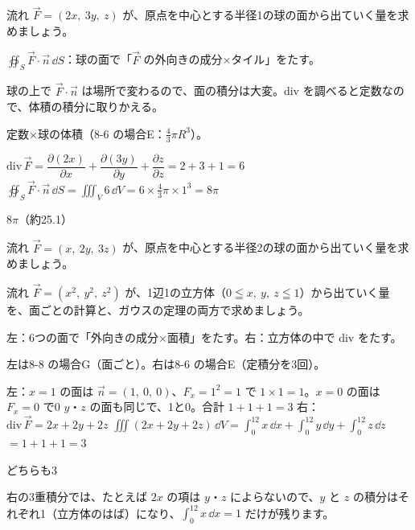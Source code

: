 \begin{reidai}
流れ $\vec F=(2x,\ 3y,\ z)$ が、原点を中心とする半径1の球の面から出ていく量を求めましょう。\par
\kangaekata {}\par
{}\enspace $\oiint_S\vec F\cdot\vec n\,\dd S$：球の面で「$\vec F$ の外向きの成分×タイル」をたす。\par
{}\enspace 球の上で $\vec F\cdot\vec n$ は場所で変わるので、面の積分は大変。div を調べると定数なので、体積の積分に取りかえる。\par
{}\enspace 定数×球の体積（8-6 の場合E：$\frac{4}{3}\pi R^3$）。\par
\shiki $\mathrm{div}\,\vec F=\dfrac{\partial(2x)}{\partial x}+\dfrac{\partial(3y)}{\partial y}+\dfrac{\partial z}{\partial z}=2+3+1=6$\kviiilq
$\displaystyle\oiint_S\vec F\cdot\vec n\,\dd S=\iiint_V6\,\dd V=6\times\frac{4}{3}\pi\times1^3=8\pi$\par
\kotae $8\pi$（約25.1）
\end{reidai}

\begin{jibun}
流れ $\vec F=(x,\ 2y,\ 3z)$ が、原点を中心とする半径2の球の面から出ていく量を求めましょう。
\end{jibun}

\begin{reidai}[立方体の両側を計算する]
流れ $\vec F=(x^2,\ y^2,\ z^2)$ が、1辺1の立方体（$0\leqq x,\ y,\ z\leqq1$）から出ていく量を、面ごとの計算と、ガウスの定理の両方で求めましょう。\par
\kangaekata {}\par
{}\enspace 左：6つの面で「外向きの成分×面積」をたす。右：立方体の中で div をたす。\par
{}\enspace 左は8-8 の場合G（面ごと）。右は8-6 の場合E（定積分を3回）。\par
\shiki 左：$x=1$ の面は $\vec n=(1,\ 0,\ 0)$、$F_x=1^2=1$ で $1\times1=1$。$x=0$ の面は $F_x=0$ で0\kviiilq
$y$・$z$ の面も同じで、1と0。合計 $1+1+1=3$\kviiilq
右：$\mathrm{div}\,\vec F=2x+2y+2z$\kviiilq
$\displaystyle\iiint(2x+2y+2z)\,\dd V=\int_0^12x\,\dd x+\int_0^12y\,\dd y+\int_0^12z\,\dd z$\kviiilq
$=1+1+1=3$\par
\kotae どちらも3
\end{reidai}
\noindent 右の3重積分では、たとえば $2x$ の項は $y$・$z$ によらないので、$y$ と $z$ の積分はそれぞれ1（立方体のはば）になり、$\int_0^12x\,\dd x=1$ だけが残ります。

